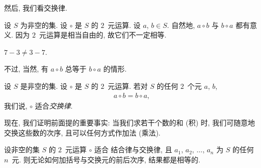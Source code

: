 \documentclass[../libro.tex]{subfiles}
\begin{document}
然后, 我们看交换律.

设 \(S\) 为非空的集.
设 \(\circ\) 是 \(S\) 的 \(2\)~元运算.
设 \(a\), \(b \in S\).
自然地, \(a \circ b\) 与 \(b \circ a\) 都有意义.
因为 \(2\)~元运算是相当自由的,
故它们不一定相等.

\begin{example}
    \(
        7 - 3 \neq 3 - 7.
    \)
\end{example}

不过, 当然, 有 \(a \circ b\)
总等于 \(b \circ a\)
的情形.

\begin{definition}
    设 \(S\) 是非空的集.
    设 \(\circ\) 是 \(S\) 的 \(2\)~元运算.
    若对 \(S\) 的任何 \(2\)~个元 \(a\), \(b\),
    \begin{align*}
        a \circ b = b \circ a,
    \end{align*}
    我们说, \(\circ\) 适合\emph{交换律}.
\end{definition}

现在, 我们证明前面提的重要事实:
当我们求若干个数的和 (积) 时,
我们可随意地交换这些数的次序,
且可以任何方式作加法 (乘法).

\begin{theorem}
    设非空的集 \(S\) 的 \(2\)~元运算 \(\circ\) 适合%
    结合律与交换律,
    且 \(a_1\), \(a_2\), \(\dots\), \(a_n\)
    为 \(S\) 的任何 \(n\)~元.
    则无论如何加括号与交换元的前后次序,
    结果都是相等的.
\end{theorem}
\end{document}
